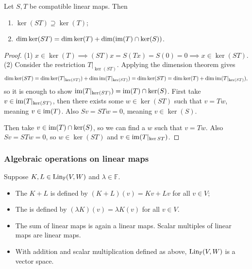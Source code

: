 \begin{proposition} \label{kernelCompositionLinearMaps}
Let $S,T$ be compatible linear maps. Then
\begin{enumerate}
\item $\ker(ST)\supseteq \ker(T)$;
\item $\dim\ker(ST) = \dim\ker(T) + \dim(\operatorname{im}(T)\cap\ker(S))$.
\end{enumerate}
\end{proposition}
\begin{proof}
(1) $x\in\ker(T) \implies (ST)x = S(Tx) = S(0) = 0 \implies x\in\ker(ST)$.
(2) Consider the restriction $T|_{\ker(ST)}$. Applying the dimension theorem gives
\[ \dim\ker(ST) = \dim\ker(T|_{\ker(ST)}) + \dim\operatorname{im}(T|_{\ker(ST)}) = \dim\ker(ST) = \dim\ker(T) + \dim\operatorname{im}(T|_{\ker(ST)}) , \]
so it is enough to show $\operatorname{im}(T|_{\ker(ST)}) = \operatorname{im}(T)\cap\ker(S)$. First take $v\in\operatorname{im}(T|_{\ker(ST)}$, then there exists some $w\in\ker(ST)$ such that $v=Tw$, meaning $v\in\operatorname{im}(T)$. Also $Sv = STw = 0$, meaning $v\in\ker(S)$.

Then take $v\in\operatorname{im}(T)\cap\ker(S)$, so we can find a $w$ such that $v = Tw$. Also $Sv = STw = 0$, so $w\in\ker(ST)$ and $v\in\operatorname{im}(T|_{\ker{ST}})$.
\end{proof}

\subsubsection{Algebraic operations on linear maps}
\begin{definition}
Suppose $K,L \in \operatorname{Lin}_{\mathbb{F}}(V,W)$ and $\lambda \in \mathbb{F}$.
\begin{itemize}
\item The  $K+L$ is defined by $(K+L)(v) = Kv+Lv$ for all $v\in V$;
\item The  is defined by $(\lambda K)(v) = \lambda K(v)$ for all $v\in V$.
\end{itemize}
\end{definition}
\begin{proposition} \label{linearMapsVectorSpace}
\begin{itemize}
\item The sum of linear maps is again a linear maps. Scalar multiples of linear maps are linear maps.
\item With addition and scalar multiplication defined as above, $\operatorname{Lin}_\mathbb{F}(V,W)$ is a vector space.
\end{itemize}
\end{proposition}

